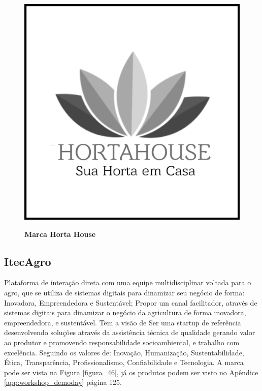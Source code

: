 \begin{figure}[H]
\centering
\caption{\textbf{Marca Horta House}}
\includegraphics[scale=0.08]{Imagens/hortahouse.png}
\label{figura_25}
\end{figure}



\subsection{ItecAgro}

Plataforma de interação direta com uma equipe multidisciplinar voltada
para o agro, que se utiliza de sistemas digitais para dinamizar seu negócio de forma: Inovadora, Empreendedora e Sustentável; Propor um canal facilitador, através de sistemas digitais para dinamizar o negócio da agricultura de forma inovadora, empreendedora, e sustentável.
Tem a visão de Ser uma startup de referência desenvolvendo soluções através da assistência técnica de qualidade gerando valor ao produtor e promovendo responsabilidade socioambiental, e trabalho com excelência.
Seguindo os valores de: Inovação, Humanização, Sustentabilidade, Ética, Transparência, Profissionalismo, Confiabilidade e Tecnologia. A marca pode ser vista na Figura \ref{figura_46}, já os produtos podem ser visto no Apêndice \ref{app:workshop_demoday} página 125.

